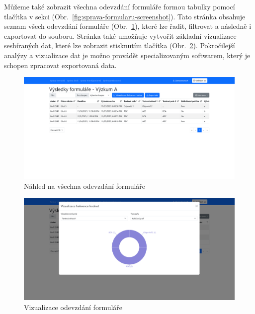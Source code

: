 Můžeme také zobrazit všechna odevzdání formuláře formou tabulky pomocí tlačítka  v sekci  (Obr.~\ref{fig:sprava-formularu-screenshot}).
Tato stránka obsahuje seznam všech odevzdání formuláře (Obr.~\ref{fig:nahled-vsechna-odevzdani-zamestnanec-screenshot}), které lze řadit, filtrovat a následně i exportovat do souboru.
Stránka také umožňuje vytvořit základní vizualizace sesbíraných dat, které lze zobrazit stisknutím tlačítka  (Obr.~\ref{fig:nahled-vsechna-odevzdani-vizualizace-zamestnanec-screenshot}).
Pokročilejší analýzy a vizualizace dat je možno provádět specializovaným softwarem, který je schopen zpracovat exportovaná data.

\begin{figure}[H]
    \centering
    \includegraphics[width=\textwidth]{../img/screenshots/vysledky-formulare}
    \caption{Náhled na všechna odevzdání formuláře}\label{fig:nahled-vsechna-odevzdani-zamestnanec-screenshot}
\end{figure}

\begin{figure}[H]
    \centering
    \includegraphics[width=\textwidth]{../img/screenshots/vysledky-formulare-vizualizace}
    \caption{Vizualizace odevzdání formuláře}\label{fig:nahled-vsechna-odevzdani-vizualizace-zamestnanec-screenshot}
\end{figure}

